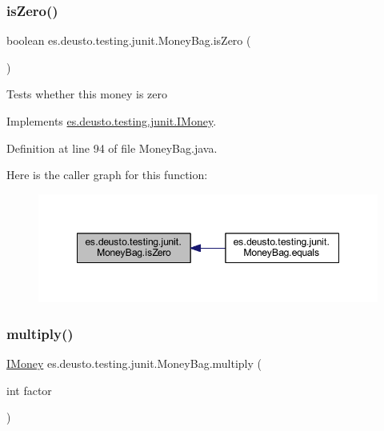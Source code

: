 \subsubsection{\texorpdfstring{is\+Zero()}{isZero()}}
{\footnotesize\ttfamily boolean es.\+deusto.\+testing.\+junit.\+Money\+Bag.\+is\+Zero (\begin{DoxyParamCaption}{ }\end{DoxyParamCaption})}

Tests whether this money is zero 

Implements \hyperlink{interfacees_1_1deusto_1_1testing_1_1junit_1_1_i_money_a166c39b6f931e49769580a04f8c73500}{es.\+deusto.\+testing.\+junit.\+I\+Money}.



Definition at line 94 of file Money\+Bag.\+java.

Here is the caller graph for this function\+:\nopagebreak
\begin{figure}[H]
\begin{center}
\leavevmode
\includegraphics[width=348pt]{classes_1_1deusto_1_1testing_1_1junit_1_1_money_bag_abebc5bc39c3343cb3c4e5fb291fd5893_icgraph}
\end{center}
\end{figure}
\mbox{\label{classes_1_1deusto_1_1testing_1_1junit_1_1_money_bag_aa20ce4cc70c2ba0bc9a5ccb96635d506}} 
\subsubsection{\texorpdfstring{multiply()}{multiply()}}
{\footnotesize\ttfamily \hyperlink{interfacees_1_1deusto_1_1testing_1_1junit_1_1_i_money}{I\+Money} es.\+deusto.\+testing.\+junit.\+Money\+Bag.\+multiply (\begin{DoxyParamCaption}\item[{int}]{factor }\end{DoxyParamCaption})}

